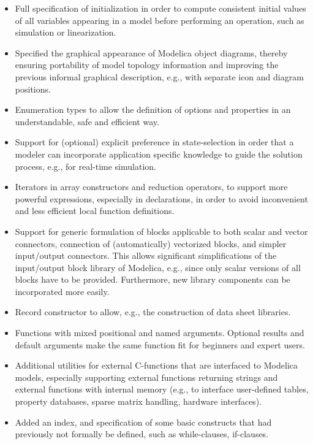 \documentclass[10pt,a4paper]{report}
\begin{document}
\begin{itemize}
\item
  Full specification of initialization in order to compute consistent
  initial values of all variables appearing in a model before performing
  an operation, such as simulation or linearization.
\item
  Specified the graphical appearance of Modelica object diagrams,
  thereby ensuring portability of model topology information and
  improving the previous informal graphical description, e.g., with
  separate icon and diagram positions.
\item
  Enumeration types to allow the definition of options and properties in
  an understandable, safe and efficient way.
\item
  Support for (optional) explicit preference in state-selection in order
  that a modeler can incorporate application specific knowledge to guide
  the solution process, e.g., for real-time simulation.
\item
  Iterators in array constructors and reduction operators, to support
  more powerful expressions, especially in declarations, in order to
  avoid inconvenient and less efficient local function definitions.
\item
  Support for generic formulation of blocks applicable to both scalar
  and vector connectors, connection of (automatically) vectorized
  blocks, and simpler input/output connectors. This allows significant
  simplifications of the input/output block library of Modelica, e.g.,
  since only scalar versions of all blocks have to be provided.
  Furthermore, new library components can be incorporated more easily.
\item
  Record constructor to allow, e.g., the construction of data sheet
  libraries.
\item
  Functions with mixed positional and named arguments. Optional results
  and default arguments make the same function fit for beginners and
  expert users.
\item
  Additional utilities for external C-functions that are interfaced to
  Modelica models, especially supporting external functions returning
  strings and external functions with internal memory (e.g., to
  interface user-defined tables, property databases, sparse matrix
  handling, hardware interfaces).
\item
  Added an index, and specification of some basic constructs that had
  previously not formally be defined, such as while-clauses, if-clauses.
\end{itemize}
\end{document}
